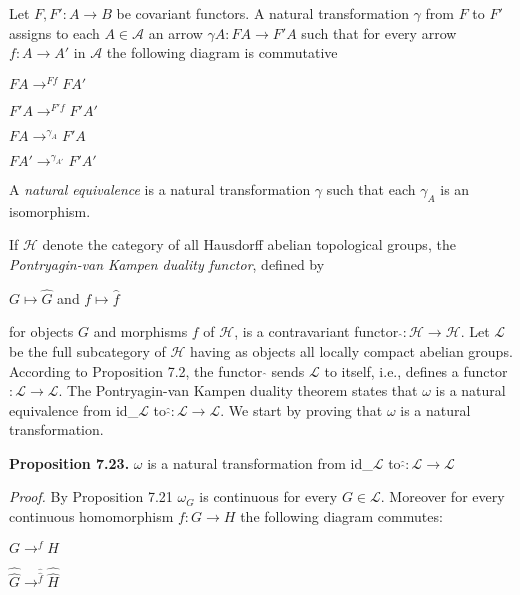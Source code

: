 \documentclass[12pt]{article}
\begin{document}
\begin{itemize}
\begin{itemize}
Let $F, F': A \to B$ be covariant functors. A natural transformation $\gamma$ from $F$ to $F'$ assigns to each $A \in \mathcal{A}$
an arrow $\gamma A : F A \to F'A$ such that for every arrow $f : A \to A'$ in $\mathcal{A}$ the following diagram is commutative



$FA \to^{Ff} FA'$ %

$F'A \to^{F'f} F'A'$ %


$FA \to^{\gamma_{A}} F'A$

$FA' \to^{\gamma_{A'}} F'A'$


    A \emph{natural equivalence} is a natural transformation $\gamma$ such that each $\gamma_A$ is an isomorphism.


    If $\mathcal{H}$ denote the category of all Hausdorff abelian topological groups, the \emph{Pontryagin-van Kampen duality
functor}, defined by


    $G \mapsto \hat{G}$ and $f \mapsto \hat{f}$


for objects $G$ and morphisms $f$ of $\mathcal{H}$, is a contravariant functor $\hat{}: \mathcal{H} \to \mathcal{H}$. Let $\mathcal{L}$ be the full subcategory of $\mathcal{H}$
having as objects all locally compact abelian groups. According to Proposition 7.2, the functor $\hat{}$ sends $\mathcal{L}$ to
itself, i.e., defines a functor $\hat{}: \mathcal{L} \to \mathcal{L}$. The Pontryagin-van Kampen duality theorem states that $\omega$ is a natural
equivalence from id_$\mathcal{L}$ to $\hat{\hat{}}: \mathcal{L} \to \mathcal{L}$. We start by proving that $\omega$ is a natural transformation.


\textbf{Proposition 7.23.} $\omega$ is a natural transformation from id_${\mathcal{L}}$ to $\hat{\hat{}}: \mathcal{L} \to \mathcal{L}$


\emph{Proof.} By Proposition 7.21 $\omega_G$ is continuous for every $G \in \mathcal{L}$. Moreover for every continuous homomorphism
$f : G \to H$ the following diagram commutes:



$G \to^{f} H$ %

$\hat{\hat{G}} \to^{\hat{\hat{f}}} \hat{\hat{H}}$ %


\end{itemize}
\end{itemize}
\end{document}
